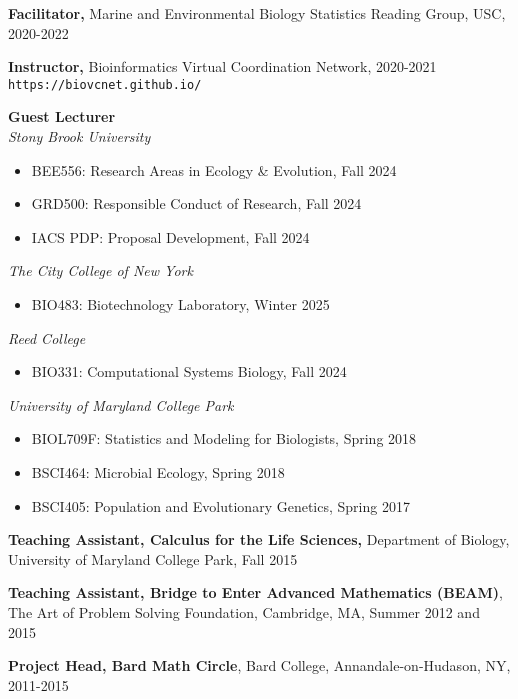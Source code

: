 \documentclass[]{res}
\begin{document}
\begin{resume}
{\bf Facilitator,} {Marine and Environmental Biology Statistics Reading Group}, USC, 2020-2022

{\bf Instructor,} Bioinformatics Virtual Coordination Network, 2020-2021\\
\verb|https://biovcnet.github.io/|

{\bf Guest Lecturer} \\
\emph{Stony Brook University}
\begin{itemize} \itemsep -2pt
\item BEE556: Research Areas in Ecology \& Evolution, Fall 2024
\item GRD500: Responsible Conduct of Research, Fall 2024
\item IACS PDP: Proposal Development, Fall 2024
\end{itemize}
\emph{The City College of New York}
\begin{itemize} \itemsep -2pt
\item BIO483: Biotechnology Laboratory, Winter 2025
\end{itemize}
\emph{Reed College}
\begin{itemize} \itemsep -2pt
\item BIO331: Computational Systems Biology, Fall 2024
\end{itemize}
\emph{University of Maryland College Park}
\begin{itemize} \itemsep -2pt
\item BIOL709F: Statistics and Modeling for Biologists, Spring 2018
\item BSCI464: Microbial Ecology, Spring 2018 
\item BSCI405: Population and Evolutionary Genetics, Spring 2017
\end{itemize}

{\bf Teaching Assistant, Calculus for the Life Sciences,} Department of Biology, University of Maryland College Park, Fall 2015%

{\bf Teaching Assistant, Bridge to Enter Advanced Mathematics (BEAM)}, The Art of Problem Solving Foundation, Cambridge, MA, Summer 2012 and 2015 %

{\bf Project Head, Bard Math Circle}, Bard College, Annandale-on-Hudason, NY, 2011-2015


\end{resume}
\end{document}
